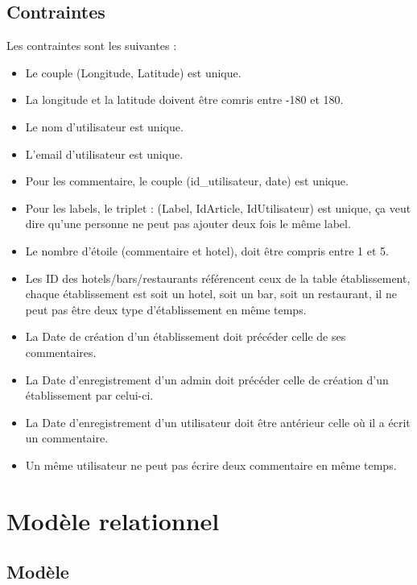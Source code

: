 \documentclass[a4paper,10pt]{article}
\begin{document}
\subsection{Contraintes}
Les contraintes sont les suivantes :
\begin{itemize}
  \item Le couple (Longitude, Latitude) est unique.
  \item La longitude et la latitude doivent être comris entre -180 et 180.
  \item Le nom d'utilisateur est unique.
  \item L'email d'utilisateur est unique.
  \item Pour les commentaire, le couple (id_utilisateur, date) est unique.
  \item Pour les labels, le triplet : (Label, IdArticle, IdUtilisateur) est
      unique, ça veut dire qu'une personne ne peut pas ajouter deux fois le
      même label.
  \item Le nombre d'étoile (commentaire et hotel), doit être compris entre 1 et 5.
  \item Les ID des hotels/bars/restaurants référencent ceux de la table
      établissement, chaque établissement est soit un hotel, soit un bar, soit
      un restaurant, il ne peut pas être deux type d'établissement en même
      temps.
  \item La Date de création d'un établissement doit précéder celle de ses commentaires.
  \item La Date d'enregistrement d'un admin doit précéder celle de création d'un établissement par celui-ci.
  \item La Date d'enregistrement d'un utilisateur doit être antérieur celle où il a écrit un commentaire.
  \item Un même utilisateur ne peut pas écrire deux commentaire en même temps.
\end{itemize}



\section{Modèle relationnel}
\subsection{Modèle}
\end{document}
